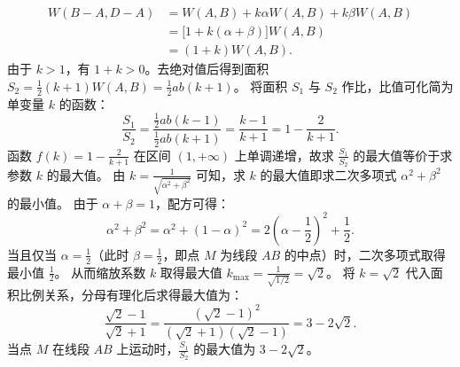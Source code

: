 \begin{solution}
\begin{align*}
W(B-A, D-A) &= W(A, B) + k\alpha W(A, B) + k\beta W(A, B) \\
&= \big[1 + k(\alpha + \beta)\big] W(A, B) \\
&= (1 + k) W(A, B).
\end{align*}
由于 $k > 1$，有 $1 + k > 0$。去绝对值后得到面积 $S_2 = \frac{1}{2} (k + 1) W(A, B) = \frac{1}{2} ab(k + 1)$。
将面积 $S_1$ 与 $S_2$ 作比，比值可化简为单变量 $k$ 的函数：
\[ \frac{S_1}{S_2} = \frac{\frac{1}{2} ab(k - 1)}{\frac{1}{2} ab(k + 1)} = \frac{k - 1}{k + 1} = 1 - \frac{2}{k + 1}. \]
函数 $f(k) = 1 - \frac{2}{k + 1}$ 在区间 $(1, +\infty)$ 上单调递增，故求 $\frac{S_1}{S_2}$ 的最大值等价于求参数 $k$ 的最大值。
由 $k = \frac{1}{\sqrt{\alpha^2 + \beta^2}}$ 可知，求 $k$ 的最大值即求二次多项式 $\alpha^2 + \beta^2$ 的最小值。
由于 $\alpha + \beta = 1$，配方可得：
\[ \alpha^2 + \beta^2 = \alpha^2 + (1 - \alpha)^2 = 2\left(\alpha - \frac{1}{2}\right)^2 + \frac{1}{2}. \]
当且仅当 $\alpha = \frac{1}{2}$（此时 $\beta = \frac{1}{2}$，即点 $M$ 为线段 $AB$ 的中点）时，二次多项式取得最小值 $\frac{1}{2}$。
从而缩放系数 $k$ 取得最大值 $k_{\max} = \frac{1}{\sqrt{1/2}} = \sqrt{2}$。
将 $k = \sqrt{2}$ 代入面积比例关系，分母有理化后求得最大值为：
\[ \frac{\sqrt{2} - 1}{\sqrt{2} + 1} = \frac{(\sqrt{2} - 1)^2}{(\sqrt{2} + 1)(\sqrt{2} - 1)} = 3 - 2\sqrt{2}. \]
当点 $M$ 在线段 $AB$ 上运动时，$\frac{S_1}{S_2}$ 的最大值为 $3 - 2\sqrt{2}$。
\end{solution}


